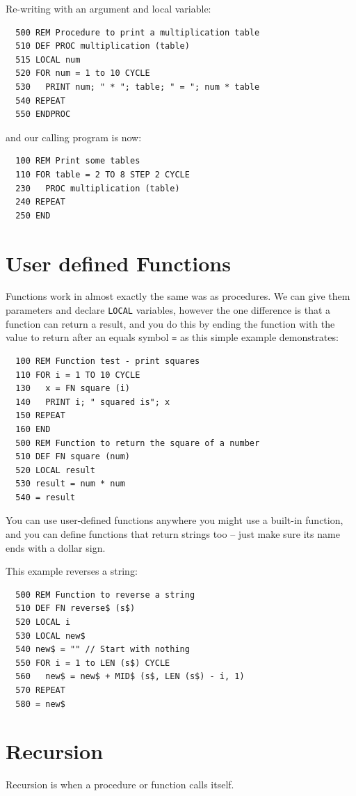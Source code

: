 Re-writing with an argument and local variable:
\begin{verbatim}
  500 REM Procedure to print a multiplication table
  510 DEF PROC multiplication (table)
  515 LOCAL num
  520 FOR num = 1 to 10 CYCLE
  530   PRINT num; " * "; table; " = "; num * table
  540 REPEAT
  550 ENDPROC
\end{verbatim}
and our calling program is now:
\begin{verbatim}
  100 REM Print some tables
  110 FOR table = 2 TO 8 STEP 2 CYCLE
  230   PROC multiplication (table)
  240 REPEAT
  250 END
\end{verbatim}

\section{User defined Functions}
Functions work in almost exactly the same was as procedures. We can
give them parameters and declare {\tt LOCAL} variables, however the
one difference is that a function can return a result, and you do this
by ending the function with the value to return after an equals symbol
{\tt =} as this simple
example demonstrates:
\begin{verbatim}
  100 REM Function test - print squares
  110 FOR i = 1 TO 10 CYCLE
  130   x = FN square (i)
  140   PRINT i; " squared is"; x
  150 REPEAT
  160 END
  500 REM Function to return the square of a number
  510 DEF FN square (num)
  520 LOCAL result
  530 result = num * num
  540 = result
\end{verbatim}
You can use user-defined functions anywhere you might use a built-in
function, and you can define functions that return strings too -- just
make sure its name ends with a dollar sign.

This example reverses a string:
\begin{verbatim}
  500 REM Function to reverse a string
  510 DEF FN reverse$ (s$)
  520 LOCAL i
  530 LOCAL new$
  540 new$ = "" // Start with nothing
  550 FOR i = 1 to LEN (s$) CYCLE
  560   new$ = new$ + MID$ (s$, LEN (s$) - i, 1)
  570 REPEAT
  580 = new$
\end{verbatim}
  

\section{Recursion}
Recursion is when a procedure or function calls itself.

